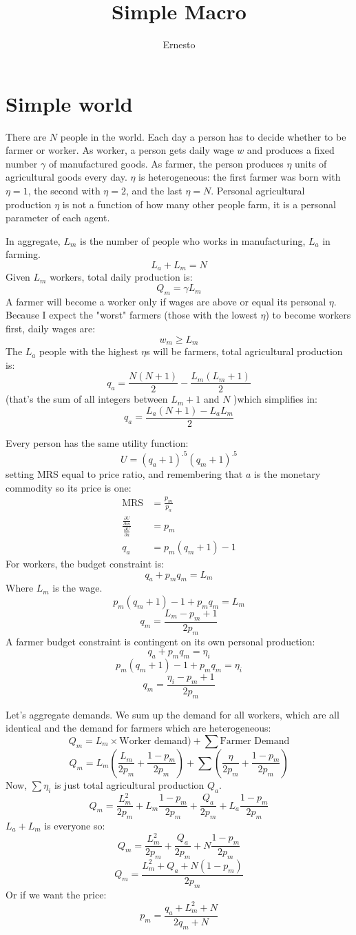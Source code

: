 \documentclass[]{article}
\title{Simple Macro}
\author{Ernesto}
\begin{document}
\maketitle

\section{Simple world}
There are $N$ people in the world. Each day a person has to decide whether to be farmer or worker.  
As worker, a person gets daily wage $w$ and produces a fixed number $\gamma$ of manufactured goods. 
As farmer, the person produces $\eta$ units of agricultural goods every day.
$\eta$ is heterogeneous: the first farmer was born with $\eta=1$, the second with $\eta=2$, and the last $\eta = N$. 
Personal agricultural production $\eta$ is not a function of how many other people farm, it is a personal parameter of each agent.

In aggregate, $L_m$ is the number of people who works in manufacturing, $L_a$ in farming. 
\[ L_a + L_m = N \]
Given $L_m$ workers, total daily production is:
\[ Q_m = \gamma L_m \]
A farmer will become a worker only if wages are above or equal its personal $\eta$. 
Because I expect the "worst" farmers (those with the lowest $\eta$) to become workers first, daily wages are:
\[ w_m \geq L_m\]
The $L_a$ people with the highest $\eta$s will be farmers, total agricultural production is:
\[ q_a =  \frac{N(N+1)}{2} - \frac{L_m(L_m+1)}{2} \]
(that's the sum of all integers between $L_m+1$ and $N$ )which simplifies in:
\[q_a = \frac{L_a(N+1) -L_aL_m}{2} \]

Every person has the same utility function:
\[ U = (q_a+1)^{.5}(q_m+1)^{.5} \]
setting MRS equal to price ratio, and remembering that $a$ is the monetary commodity so its price is one:
\begin{align*}
\text{MRS} &= \frac{p_m}{p_a} \\
\frac{\frac{\partial U}{\partial m}}{\frac{\partial U}{\partial a}} &= p_m \\
q_a &= p_m(q_m+1)-1
\end{align*}
For workers, the budget constraint is:
\[ q_a + p_m q_m = L_m  \]
Where $L_m$ is the wage.
\[  p_m(q_m+1)-1 + p_m q_m = L_m  \]
\[ q_m = \frac{L_m-p_m+1}{2 p_m}  \]
A farmer budget constraint is contingent on its own personal production:
\[q_a + p_m q_m = \eta_i \]
\[ p_m(q_m+1)-1 + p_m q_m = \eta_i \]
\[ q_m = \frac{\eta_i-p_m+1}{2 p_m} \]

Let's aggregate demands. We sum up the demand for all workers, which are all identical and the demand for farmers which are heterogeneous:
\[Q_m = L_m \times \text{Worker demand}) + \sum \text{Farmer Demand}\]
\[ Q_m = L_m \left( \frac{L_m}{2p_m} + \frac{1 - p_m}{2p_m} \right) +  \sum \left( \frac{\eta}{2p_m} + \frac{1 - p_m}{2p_m} \right) \]
Now, $\sum \eta_i$ is just total agricultural production $Q_a$.
\[ Q_m = \frac{L^2_m}{2p_m} + L_m\frac{1 - p_m}{2p_m}  +   \frac{Q_a}{2p_m} + L_a\frac{1 - p_m}{2p_m}  \]
$L_a + L_m$ is everyone so:
\[ Q_m = \frac{L^2_m}{2p_m} +   \frac{Q_a}{2p_m} + N\frac{1 - p_m}{2p_m}  \]
\[ Q_m = \frac{L^2_m + Q_a +N(1 - p_m)}{2p_m} \]
Or if we want the price:
\[ p_m = \frac{q_a + L_m^2 + N}{2 q_m + N}\]
\end{document}

